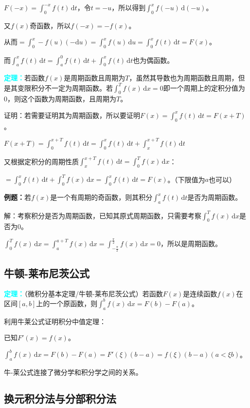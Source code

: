 \documentclass[UTF8, 12pt]{ctexart}
\begin{document}
$F(-x)=\int_0^{-x}f(t)\,\textrm{d}t$，令$t=-u$，所以得到$\int_0^xf(-u)\,\textrm{d}(-u)$。

又$f(x)$奇函数，所以$f(-x)=-f(x)$。

从而$=\int_0^x-f(u)(-\textrm{d}u)=\int_0^xf(u)\,\textrm{d}u=\int_0^xf(t)\,\textrm{d}t=F(x)$。

而$\int_a^xf(t)\,\textrm{d}t=\int_a^0f(t)\,\textrm{d}t+\int_0^xf(t)\,\textrm{d}t$也为偶函数。

\textcolor{aqua}{\textbf{定理：}}若函数$f(x)$是周期函数且周期为$T$，虽然其导数也为周期函数且周期，但是其变限积分不一定为周期函数。若$\int_0^Tf(x)\,\textrm{d}x=0$即一个周期上的定积分值为0，则这个函数为周期函数，且周期为$T$。

证明：若需要证明其为周期函数，所以要证明$F(x)=\int_0^xf(t)\,\textrm{d}t=F(x+T)$。

$F(x+T)=\int_0^{x+T}f(t)\,\textrm{d}t=\int_0^xf(t)\,\textrm{d}t+\int_x^{x+T}f(t)\,\textrm{d}t$

又根据定积分的周期性质$\int_x^{x+T}f(t)\,\textrm{d}t=\int_0^Tf(x)\,\textrm{d}x$：

$=\int_0^xf(t)\,\textrm{d}t+\int_0^Tf(x)\,\textrm{d}x=\int_0^xf(t)\,\textrm{d}t=F(x)$。（下限值为$a$也可以）

\textbf{例题：}若$f(x)$是一个有周期的奇函数，则其积分$\int_a^xf(t)\,\textrm{d}t$是否为周期函数。

解：考察积分是否为周期函数，已知其原式周期函数，只需要考察$\int_0^Tf(x)\,\textrm{d}x$是否为0。

$\int_0^Tf(x)\,\textrm{d}x=\int_a^{a+T}f(x)\,\textrm{d}x=\int_{-\frac{\pi}{2}}^{\frac{\pi}{2}}f(x)\,\textrm{d}x=0$，所以是周期函数。

\subsection{牛顿-莱布尼茨公式}

\textcolor{aqua}{\textbf{定理：}}（微积分基本定理/牛顿-莱布尼茨公式）若函数$F(x)$是连续函数$f(x)$在区间$[a,b]$上的一个原函数，则$\int_a^bf(x)\,\textrm{d}x=F(b)-F(a)$。

利用牛莱公式证明积分中值定理：

已知$F'(x)=f(x)$。

$\int_a^bf(x)\,\textrm{d}x=F(b)-F(a)=F'(\xi)(b-a)=f(\xi)(b-a)(a<\xi b)$。

牛-莱公式连接了微分学和积分学之间的关系。

\subsection{换元积分法与分部积分法}
\end{document}
